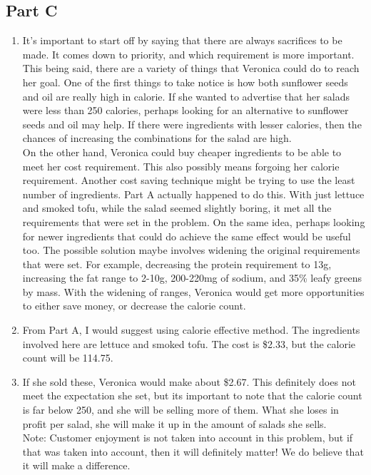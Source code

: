 \documentclass[11pt,letterpaper]{article}
\begin{document}
\subsection*{Part C}
\begin{enumerate}
	\item It's important to start off by saying that there are always sacrifices to be made. It comes down to priority, and which requirement is more important. This being said, there are a variety of things that Veronica could do to reach her goal. One of the first things to take notice is how both sunflower seeds and oil are really high in calorie. If she wanted to advertise that her salads were less than 250 calories, perhaps looking for an alternative to sunflower seeds and oil may help. If there were ingredients with lesser calories, then the chances of increasing the combinations for the salad are high. \\
	On the other hand, Veronica could buy cheaper ingredients to be able to meet her cost requirement. This also possibly means forgoing her calorie requirement. Another cost saving technique might be trying to use the least number of ingredients. Part A actually happened to do this. With just lettuce and smoked tofu, while the salad seemed slightly boring, it met all the requirements that were set in the problem. On the same idea, perhaps looking for newer ingredients that could do achieve the same effect would be useful too.
	The possible solution maybe involves widening the original requirements that were set. For example, decreasing the protein requirement to 13g, increasing the fat range to 2-10g, 200-220mg of sodium, and 35\% leafy greens by mass. With the widening of ranges, Veronica would get more opportunities to either save money, or decrease the calorie count.
	\item From Part A, I would suggest using calorie effective method. The ingredients involved here are lettuce and smoked tofu. The cost is \$2.33, but the calorie count will be 114.75. 
	\item If she sold these, Veronica would make about \$2.67. This definitely does not meet the expectation she set, but its important to note that the calorie count is far below 250, and she will be selling more of them. What she loses in profit per salad, she will make it up in the amount of salads she sells.\\

	Note: Customer enjoyment is not taken into account in this problem, but if that was taken into account, then it will definitely matter! We do believe that it will make a difference.
\end{enumerate}
\end{document}
